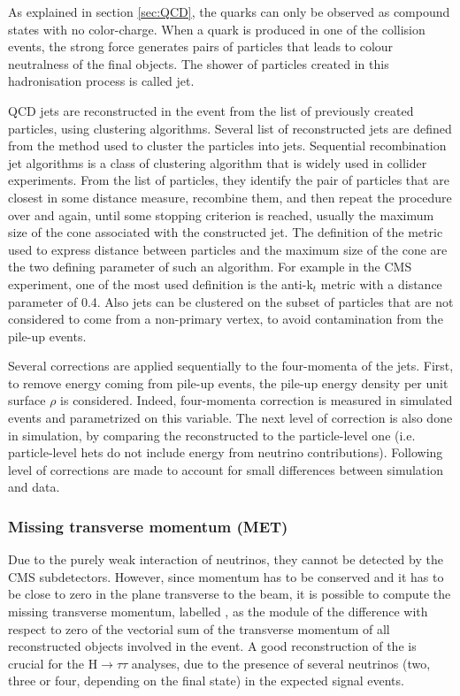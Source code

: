 As explained in section \ref{sec:QCD}, the quarks can only be observed as compound states with no color-charge. When a quark is produced in one of the collision events, the strong force generates pairs of particles that leads to colour neutralness of the final objects. The shower of particles created in this hadronisation process is called jet.

QCD jets are reconstructed in the event from the list of previously created particles, using clustering algorithms. Several list of reconstructed jets are defined from the method used to cluster the particles into jets. Sequential recombination jet algorithms is a class of clustering algorithm that is widely used in collider experiments. From the list of particles, they identify the pair of particles that are closest in some distance measure, recombine them, and then repeat the procedure over and again, until some stopping criterion is reached, usually the maximum size of the cone associated with the constructed jet. The definition of the metric used to express distance between particles and the maximum size of the cone are the two defining parameter of such an algorithm. For example in the CMS experiment, one of the most used definition is the anti-k$_t$ metric with a distance parameter of 0.4. Also jets can be clustered on the subset of particles that are not considered to come from a non-primary vertex, to avoid contamination from the pile-up events.

Several corrections are applied sequentially to the four-momenta of the jets. First, to remove energy coming from pile-up events, the pile-up energy density per unit surface $\rho$ is considered. Indeed, four-momenta correction is measured in simulated events and parametrized on this variable. The next level of correction is also done in simulation, by comparing the reconstructed \pt to the particle-level one (i.e. particle-level hets do not include energy from neutrino contributions). Following level of corrections are made to account for small differences between simulation and data.

\subsubsection{Missing transverse momentum (MET)}
Due to the purely weak interaction of neutrinos, they cannot be detected by the CMS subdetectors. However, since momentum has to be conserved and it has to be close to zero in the plane transverse to the beam, it is possible to compute the missing transverse momentum, labelled \ETm, as the module of the difference with respect to zero of the vectorial sum of the transverse momentum of all reconstructed objects involved in the event. A good reconstruction of the \ETm is crucial for the H$\rightarrow\tau\tau$ analyses, due to the presence of several neutrinos (two, three or four, depending on the final state) in the expected signal events.

